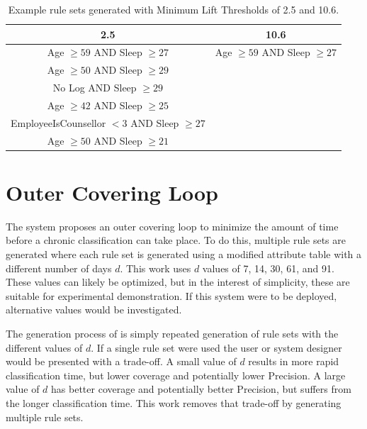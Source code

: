 \begin{table}[h]
	\centering

	\begin{tabular}{cc}
	\toprule
	2.5 & 10.6 \\
	\midrule
	Age $\geq 59$ AND Sleep $\geq 27$ & Age $\geq 59$ AND Sleep $\geq 27$ \\
	Age $\geq 50$ AND Sleep $\geq 29$ & \\
	No Log AND Sleep $\geq 29$ & \\
	Age $\geq 42$ AND Sleep $\geq 25$ & \\
	EmployeeIsCounsellor $< 3$ AND Sleep $\geq 27$ & \\
	Age $\geq 50$ AND Sleep $\geq 21$ & \\
	\bottomrule
	\end{tabular}

	\caption{Example rule sets generated with Minimum Lift Thresholds of 2.5 and 10.6.}
	\label{tbl:algo:exampleminlift}
\end{table}


\section{Outer Covering Loop} \label{chap:algo:proposed}


The \Abb system proposes an outer covering loop to minimize the amount of time before a chronic classification can take place. To do this, multiple rule sets are generated where each rule set is generated using a modified attribute table with a different number of days $d$. This work uses $d$ values of 7, 14, 30, 61, and 91. These values can likely be optimized, but in the interest of simplicity, these are suitable for experimental demonstration. If this system were to be deployed, alternative values would be investigated. 

The generation process of \Abb is simply repeated generation of rule sets with the different values of $d$. If a single rule set were used the user or system designer would be presented with a trade-off. A small value of $d$ results in more rapid classification time, but lower coverage and potentially lower Precision. A large value of $d$ has better coverage and potentially better Precision, but suffers from the longer classification time. This work removes that trade-off by generating multiple rule sets. 


